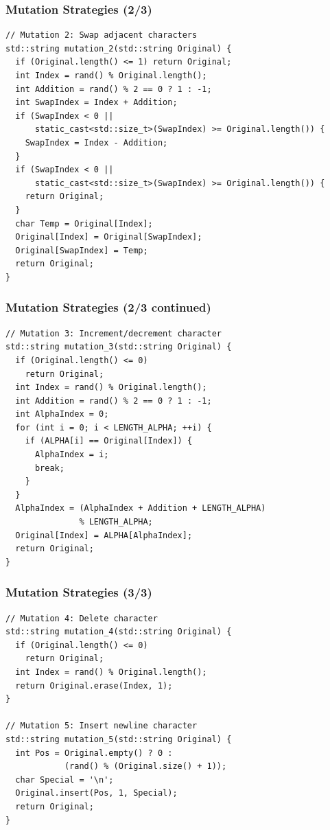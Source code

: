 \documentclass{beamer}
\begin{document}
\begin{frame}[fragile]
\frametitle{Mutation Strategies (2/3)}
\begin{lstlisting}
// Mutation 2: Swap adjacent characters
std::string mutation_2(std::string Original) {
  if (Original.length() <= 1) return Original;
  int Index = rand() % Original.length();
  int Addition = rand() % 2 == 0 ? 1 : -1;
  int SwapIndex = Index + Addition;
  if (SwapIndex < 0 || 
      static_cast<std::size_t>(SwapIndex) >= Original.length()) {
    SwapIndex = Index - Addition;
  }
  if (SwapIndex < 0 || 
      static_cast<std::size_t>(SwapIndex) >= Original.length()) {
    return Original;
  }
  char Temp = Original[Index];
  Original[Index] = Original[SwapIndex];
  Original[SwapIndex] = Temp;
  return Original;
}
\end{lstlisting}
\end{frame}

\begin{frame}[fragile]
\frametitle{Mutation Strategies (2/3 continued)}
\begin{lstlisting}
// Mutation 3: Increment/decrement character
std::string mutation_3(std::string Original) {
  if (Original.length() <= 0)
    return Original;
  int Index = rand() % Original.length();
  int Addition = rand() % 2 == 0 ? 1 : -1;
  int AlphaIndex = 0;
  for (int i = 0; i < LENGTH_ALPHA; ++i) {
    if (ALPHA[i] == Original[Index]) {
      AlphaIndex = i;
      break;
    }
  }
  AlphaIndex = (AlphaIndex + Addition + LENGTH_ALPHA) 
               % LENGTH_ALPHA;
  Original[Index] = ALPHA[AlphaIndex];
  return Original;
}
\end{lstlisting}
\end{frame}

\begin{frame}[fragile]
\frametitle{Mutation Strategies (3/3)}
\begin{lstlisting}
// Mutation 4: Delete character
std::string mutation_4(std::string Original) {
  if (Original.length() <= 0)
    return Original;
  int Index = rand() % Original.length();
  return Original.erase(Index, 1);
}

// Mutation 5: Insert newline character
std::string mutation_5(std::string Original) {
  int Pos = Original.empty() ? 0 : 
            (rand() % (Original.size() + 1));
  char Special = '\n';
  Original.insert(Pos, 1, Special);
  return Original;
}
\end{lstlisting}
\end{frame}
\end{document}
